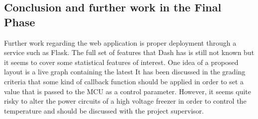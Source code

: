 \documentclass[10pt]{article}
\begin{document}
\newpage
\subsection*{Conclusion and further work in the Final Phase}%
\label{sec:conclusion}
Further work regarding the web application is proper deployment through a service such as Flask. The full set of features that Dash has is still not known but it seems to cover some statistical features of interest. One idea of a proposed layout is a live graph containing the latest It has been discussed in the grading criteria that some kind of callback function should be applied in order to set a value that is passed to the MCU as a control parameter. However, it seems quite risky to alter the power circuits of a high voltage freezer in order to control the temperature and should be discussed with the project supervisor.

\newpage
\end{document}
